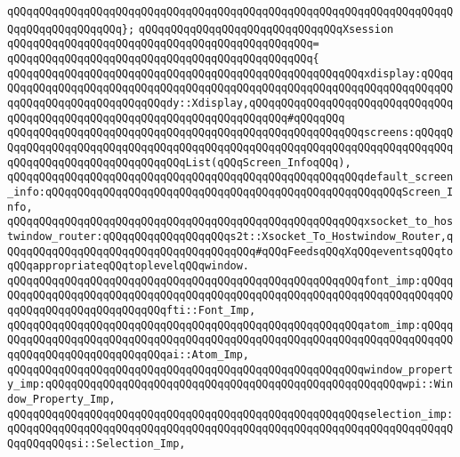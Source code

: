 \verb|qQQqqQQqqQQqqQQqqQQqqQQqqQQqqQQqqQQqqQQqqQQqqQQqqQQqqQQqqQQqqQQqqQQqqQQqqQQqqQQqqQQqqQQq};|\newline
\newline
\verb|qQQqqQQqqQQqqQQqqQQqqQQqqQQqqQQqXsession|\newline
\verb|qQQqqQQqqQQqqQQqqQQqqQQqqQQqqQQqqQQqqQQqqQQqqQQq=|\newline
\verb|qQQqqQQqqQQqqQQqqQQqqQQqqQQqqQQqqQQqqQQqqQQqqQQq{|\newline
\verb|qQQqqQQqqQQqqQQqqQQqqQQqqQQqqQQqqQQqqQQqqQQqqQQqqQQqqQQqxdisplay:qQQqqQQqqQQqqQQqqQQqqQQqqQQqqQQqqQQqqQQqqQQqqQQqqQQqqQQqqQQqqQQqqQQqqQQqqQQqqQQqqQQqqQQqqQQqqQQqqQQqdy::Xdisplay,qQQqqQQqqQQqqQQqqQQqqQQqqQQqqQQqqQQqqQQqqQQqqQQqqQQqqQQqqQQqqQQqqQQqqQQqqQQq#qQQqqQQq|\newline
\verb|qQQqqQQqqQQqqQQqqQQqqQQqqQQqqQQqqQQqqQQqqQQqqQQqqQQqqQQqscreens:qQQqqQQqqQQqqQQqqQQqqQQqqQQqqQQqqQQqqQQqqQQqqQQqqQQqqQQqqQQqqQQqqQQqqQQqqQQqqQQqqQQqqQQqqQQqqQQqqQQqqQQqList(qQQqScreen_InfoqQQq),|\newline
\newline
\verb|qQQqqQQqqQQqqQQqqQQqqQQqqQQqqQQqqQQqqQQqqQQqqQQqqQQqqQQqdefault_screen_info:qQQqqQQqqQQqqQQqqQQqqQQqqQQqqQQqqQQqqQQqqQQqqQQqqQQqqQQqScreen_Info,|\newline
\newline
\verb|qQQqqQQqqQQqqQQqqQQqqQQqqQQqqQQqqQQqqQQqqQQqqQQqqQQqqQQqxsocket_to_hostwindow_router:qQQqqQQqqQQqqQQqqQQqs2t::Xsocket_To_Hostwindow_Router,qQQqqQQqqQQqqQQqqQQqqQQqqQQqqQQqqQQqqQQq#qQQqFeedsqQQqXqQQqeventsqQQqtoqQQqappropriateqQQqtoplevelqQQqwindow.|\newline
\newline
\verb|qQQqqQQqqQQqqQQqqQQqqQQqqQQqqQQqqQQqqQQqqQQqqQQqqQQqqQQqfont_imp:qQQqqQQqqQQqqQQqqQQqqQQqqQQqqQQqqQQqqQQqqQQqqQQqqQQqqQQqqQQqqQQqqQQqqQQqqQQqqQQqqQQqqQQqqQQqqQQqqQQqfti::Font_Imp,|\newline
\verb|qQQqqQQqqQQqqQQqqQQqqQQqqQQqqQQqqQQqqQQqqQQqqQQqqQQqqQQqatom_imp:qQQqqQQqqQQqqQQqqQQqqQQqqQQqqQQqqQQqqQQqqQQqqQQqqQQqqQQqqQQqqQQqqQQqqQQqqQQqqQQqqQQqqQQqqQQqqQQqqQQqai::Atom_Imp,|\newline
\newline
\verb|qQQqqQQqqQQqqQQqqQQqqQQqqQQqqQQqqQQqqQQqqQQqqQQqqQQqqQQqwindow_property_imp:qQQqqQQqqQQqqQQqqQQqqQQqqQQqqQQqqQQqqQQqqQQqqQQqqQQqqQQqwpi::Window_Property_Imp,|\newline
\verb|qQQqqQQqqQQqqQQqqQQqqQQqqQQqqQQqqQQqqQQqqQQqqQQqqQQqqQQqselection_imp:qQQqqQQqqQQqqQQqqQQqqQQqqQQqqQQqqQQqqQQqqQQqqQQqqQQqqQQqqQQqqQQqqQQqqQQqqQQqqQQqsi::Selection_Imp,|\newline
